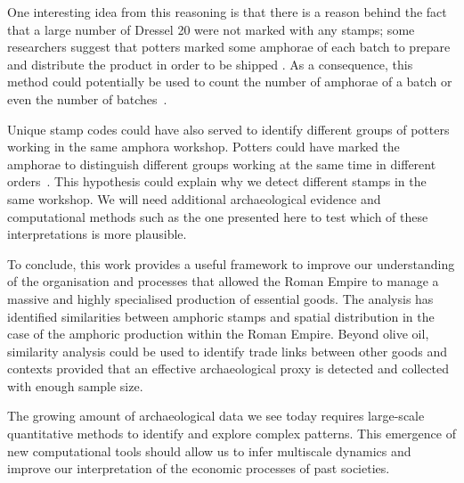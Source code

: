 One interesting idea from this reasoning is that there is a reason behind the fact that a large number of Dressel 20 were not marked with any stamps; some researchers suggest that potters marked some amphorae of each batch to prepare and distribute the product in order to be shipped \citep{berni_millet_epigrafianforica_2008}. As a consequence, this method could potentially be used to count the number of amphorae of a batch or even the number of batches~\citep{juanmorostesis}. 

Unique stamp codes could have also served to identify different groups of potters working in the same amphora workshop. Potters could have marked the amphorae to distinguish different groups working at the same time in different orders~\citep{li_crossbows_2014}. This hypothesis could explain why we detect different stamps in the same workshop. We will need additional archaeological evidence and computational methods such as the one presented here to test which of these interpretations is more plausible.

To conclude, this work provides a useful framework to improve our understanding of the organisation and processes that allowed the Roman Empire to manage a massive and highly specialised production of essential goods. The analysis has identified similarities between amphoric stamps and spatial distribution in the case of the amphoric production within the Roman Empire. Beyond olive oil, similarity analysis could be used to identify trade links between other goods and contexts provided that an effective archaeological proxy is detected and collected with enough sample size.

The growing amount of archaeological data we see today requires large-scale quantitative methods to identify and explore complex patterns. This emergence of new computational tools should allow us to infer multiscale dynamics and improve our interpretation of the economic processes of past societies. 



